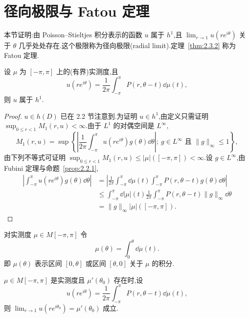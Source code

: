 \section{径向极限与 Fatou 定理}\label{sec:2.3}


本节证明:由 Poisson--Stieltjes 积分表示的函数 $u$ 属于 $h^{1}$,且 $\lim_{r \to 1}u(re^{i\theta})$ 关于 $\theta$ 几乎处处存在.这个极限称为径向极限(radial limit).定理~\ref{thm:2.3.2} 称为 Fatou 定理.

\begin{theorem}\label{thm:2.3.1}
设 $\mu$ 为 $[-\pi, \pi]$ 上的(有界)实测度,且
\begin{equation*}
u(re^{i\theta}) = \frac{1}{2\pi}\int_{-\pi}^{\pi}P(r, \theta - t)\dd\mu(t),
\end{equation*}
则 $u$ 属于 $h^{1}$.
\end{theorem}

\begin{proof}
$u \in h(D)$ 已在 2.2 节注意到.为证明 $u \in h^{1}$,由定义只需证明 $\sup_{0 \leq r < 1}M_{1}(r, u) < \infty$.由于 $L^{1}$ 的对偶空间是 $L^{\infty}$,
\begin{equation*}
M_{1}(r, u) = \sup\left\{\left|\frac{1}{2\pi}\int_{-\pi}^{\pi}u(re^{i\theta})g(\theta)\dd\theta\right|;\ g \in L^{\infty} \text{ 且 } \|g\|_{\infty} \leq 1\right\},
\end{equation*}
由下列不等式可证明 $\sup_{0 \leq r < 1}M_{1}(r, u) \leq |\mu|([-\pi, \pi]) < \infty$.设 $g \in L^{\infty}$,由 Fubini 定理与命题~\ref{prop:2.2.1},
\begin{align*}
\left|\int_{-\pi}^{\pi}u(re^{i\theta})g(\theta)\dd\theta\right| & = \left|\frac{1}{2\pi}\int_{-\pi}^{\pi}\dd\mu(t)\int_{-\pi}^{\pi}P(r, \theta - t)g(\theta)\dd\theta\right| \\
& \leq \int_{-\pi}^{\pi}\dd|\mu|(t)\frac{1}{2\pi}\int_{-\pi}^{\pi}P(r, \theta - t)\|g\|_{\infty}\dd\theta \\
& = \|g\|_{\infty}|\mu|([-\pi, \pi]).
\end{align*}
\end{proof}

对实测度 $\mu \in M[-\pi, \pi]$ 令
\begin{equation*}
\mu(\theta) = \int_{0}^{\theta}\dd\mu(t).
\end{equation*}
即 $\mu(\theta)$ 表示区间 $[0, \theta]$ 或区间 $[\theta, 0]$ 关于 $\mu$ 的积分.

\begin{theorem}[Fatou]\label{thm:2.3.2}
$\mu \in M[-\pi, \pi]$ 是实测度且 $\mu'(\theta_{0})$ 存在时,设
\begin{equation*}
u(re^{i\theta}) = \frac{1}{2\pi}\int_{-\pi}^{\pi}P(r, \theta - t)\dd\mu(t),
\end{equation*}
则 $\lim_{r \to 1}u(re^{i\theta_{0}}) = \mu'(\theta_{0})$ 成立.
\end{theorem}

